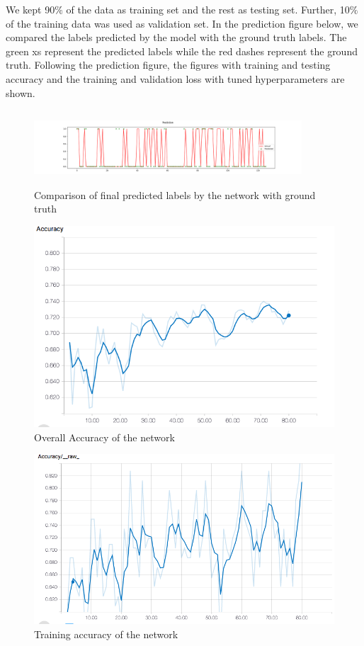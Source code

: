 \documentclass[journal]{IEEEtran}
\begin{document}
We kept 90$\%$ of the data as training set and the rest as testing set. Further, 10$\%$ of the training data was used as validation set. In the prediction figure below, we compared the labels predicted by the model with the ground truth labels. The green xs represent the predicted labels while the red dashes represent the ground truth.
\newline
Following the prediction figure, the figures with training and testing accuracy and the training and validation loss with tuned hyperparameters are shown.

\begin{figure}[ht!]
    \centering
    \includegraphics[width=10cm, height=2.8cm]{Prediction.png}
    \caption{Comparison of final predicted labels by the network with ground truth}
    \label{fig:Prediction}
\end{figure}

\begin{figure}[ht!]
    \centering
    \includegraphics[scale = 0.3]{Acc_76_1.png}
    \caption{Overall Accuracy of the network}
    \label{fig:Acc1}
\end{figure}

\begin{figure}[ht!]
    \centering
    \includegraphics[scale = 0.3]{Acc_76_2.png}
    \caption{Training accuracy of the network}
    \label{fig:Acc2}
\end{figure}
\end{document}
